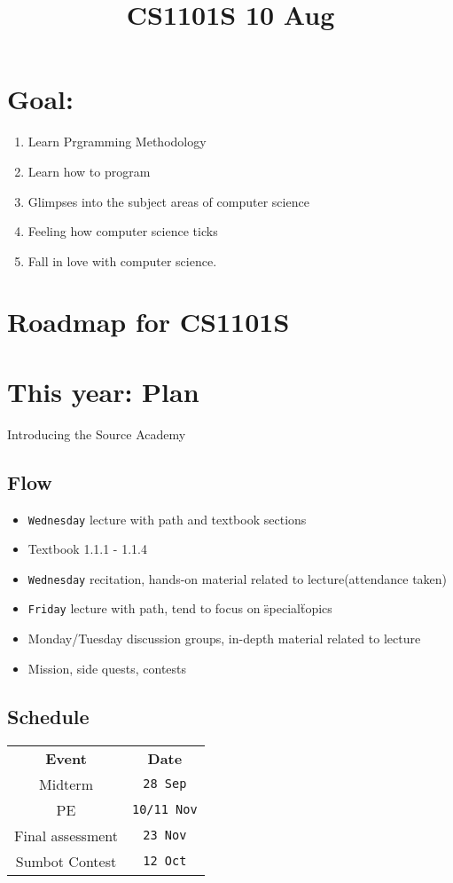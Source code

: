 \documentclass{article}
\begin{document}
\title{CS1101S 10 Aug}
\section{Goal:}
\begin{enumerate}
\item Learn Prgramming Methodology
\item Learn how to program
\item Glimpses into the subject areas of computer science
\item Feeling how computer science ticks
\item Fall in love with computer science.
\end{enumerate}
\section{Roadmap for CS1101S}
\begin{figure}
\end{figure}
\section{This year: Plan}
Introducing the Source Academy
\subsection{Flow}
\begin{itemize}
\item \texttt{Wednesday} lecture with path and textbook sections
\item[] Textbook 1.1.1 - 1.1.4
\item \texttt{Wednesday} recitation, hands-on material related to lecture(attendance taken)
\item \texttt{Friday} lecture with path, tend to focus on \"special\" topics
\item Monday/Tuesday discussion groups, in-depth material related to lecture
\item Mission, side quests, contests
\end{itemize}
\subsection{Schedule}
\begin{table}[h]
\centering
\label{my-label}
\begin{tabular}{cc}
\textbf{Event}   & \textbf{Date}        \\
Midterm          & \texttt{28 Sep}    \\
PE               & \texttt{10/11 Nov} \\
Final assessment & \texttt{23 Nov}     \\
Sumbot Contest   & \texttt{12 Oct}   
\end{tabular}
\end{table}
\end{document}

